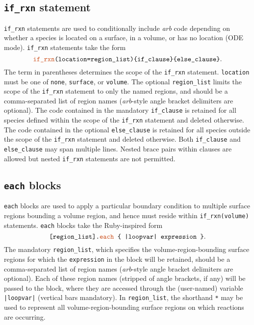 \documentclass[fontsize=12pt,
               captions=abovetable,
               numbers=noenddot,
              ]{scrartcl}
\newcommand{\syntax}[2]{\textcolor{#1}{\texttt{#2}}}
\begin{document}
\subsection{\syntax{template}{if\_rxn} statement}

\syntax{template}{if\_rxn} statements are used to conditionally include \emph{arb} code depending on whether a species is located on a surface, in a volume, or has no location (ODE mode). \syntax{template}{if\_rxn} statements take the form
%
\begin{equation*}
\syntax{template}{if\_rxn}\texttt{(location=region\_list)\char`\{if\_clause\char`\}\char`\{else\_clause\char`\}}.
\end{equation*}
%
The term in parentheses determines the scope of the \syntax{template}{if\_rxn} statement. \texttt{location} must be one of \texttt{none}, \texttt{surface}, or \texttt{volume}. The optional \texttt{region\_list} limits the scope of the \syntax{template}{if\_rxn} statement to only the named regions, and should be a comma-separated list of region names (\emph{arb}-style angle bracket delimiters are optional). The code contained in the mandatory \texttt{if\_clause} is retained for all species defined within the scope of the \syntax{template}{if\_rxn} statement and deleted otherwise. The code contained in the optional \texttt{else\_clause} is retained for all species outside the scope of the \syntax{template}{if\_rxn} statement and deleted otherwise. Both \texttt{if\_clause} and \texttt{else\_clause} may span multiple lines. Nested brace pairs within clauses are allowed but nested \syntax{template}{if\_rxn} statements are not permitted.

\subsection{\syntax{template}{each} blocks}

\syntax{template}{each} blocks are used to apply a particular boundary condition to multiple surface regions bounding a volume region, and hence must reside within \syntax{template}{if\_rxn}\texttt{(volume)} statements. \syntax{template}{each} blocks take the Ruby-inspired form
%
\begin{equation*}
\texttt{[region\_list].\syntax{template}{each} \char`\{\ |loopvar| expression \char`\}}.
\end{equation*}
%
The mandatory \texttt{region\_list}, which specifies the volume-region-bounding surface regions for which the \texttt{expression} in the block will be retained, should be a comma-separated list of region names (\emph{arb}-style angle bracket delimiters are optional). Each of these region names (stripped of angle brackets, if any) will be passed to the block, where they are accessed through the (user-named) variable \texttt{|loopvar|} (vertical bars mandatory). In \texttt{region\_list}, the shorthand \texttt{*} may be used to represent all volume-region-bounding surface regions on which reactions are occurring.
\end{document}
